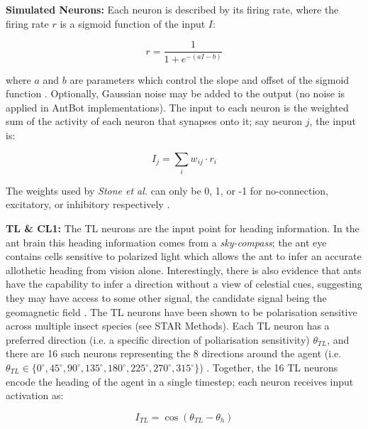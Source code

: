 \documentclass[a4paper,11pt,twoside,openright]{article}
\begin{document}
\textbf{Simulated Neurons:}
Each neuron is described by its firing rate, where the firing rate $r$ is
a sigmoid function of the input $I$:

\begin{equation}\label{eq:sig}
r = \frac{1}{1 + e^{-(aI - b)}}
\end{equation}

where $a$ and $b$ are parameters which control the slope and offset of
the sigmoid function \cite{Stone2017}. Optionally, Gaussian noise may
be added to the output (no noise is applied in AntBot
implementations). The input to each neuron is the weighted sum of the
activity of each neuron that synapses onto it; say neuron $j$, the
input is:

\begin{equation}
  I_j = \sum_{i} w_{ij} \cdot r_i
\end{equation}

The weights used by \textit{Stone et al.} can only be 0, 1, or -1 for
no-connection, excitatory, or inhibitory respectively \cite{Stone2017}.
\newline
\par

\textbf{TL \& CL1:}
The TL neurons are the input point for heading information. In the ant brain
this heading information comes from a \textit{sky-compass}; the ant eye contains
cells sensitive to polarized light which allows the ant to infer an accurate
allothetic heading from vision alone. Interestingly, there is also evidence that ants
have the capability to infer a direction without a view of celestial cues,
suggesting they may have access to some other signal, the candidate signal being
the geomagnetic field \cite{Fleischmann2018, Grob2017}. The TL neurons have been
shown to be polarisation sensitive across multiple insect species \cite{Stone2017}
(see STAR Methods). Each TL neuron has a preferred direction (i.e. a specific
direction of poliarisation sensitivity) $\theta_{TL} $, and there are 16 such
neurons representing the 8 directions around the agent (i.e.
$\theta_{TL} \in \{ 0^{\circ}, 45^{\circ}, 90^{\circ}, 135^{\circ}, 180^{\circ},
225^{\circ}, 270^{\circ}, 315^{\circ}\} $) \cite{Stone2017}. Together, the 16
TL neurons encode the heading of the agent in a single timestep; each neuron
receives input activation as:

\begin{equation}
  I_{TL} = \cos ( \theta_{TL} - \theta_{h} )
\end{equation}
\end{document}
